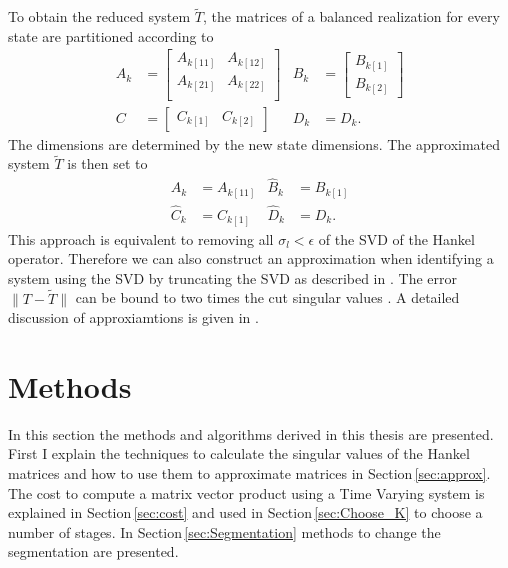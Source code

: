 \documentclass[numbers=noenddot,doctype=mastersthesis,BCOR=15mm,biblatex]{ldvbook}%
\begin{document}
To obtain the reduced system $\tilde{T}$, the matrices of a balanced realization for every state are partitioned according to
\begin{subequations}\label{eq:segmented_system}
\begin{align}
	A_k &=\begin{bmatrix}
	A_{k[11]} & A_{k[12]} \\
	A_{k[21]} & A_{k[22]} \\
	\end{bmatrix}
	&
	B_k &= \begin{bmatrix}
	B_{k[1]} \\ B_{k[2]}
	\end{bmatrix} 
	\\
	C &= \begin{bmatrix}
	C_{k[1]} & C_{k[2]}
	\end{bmatrix}& 
	D_k&=D_k.
\end{align}
\end{subequations}
The dimensions are determined by the new state dimensions.
The approximated system $\tilde{T}$ is then set to
\begin{subequations}
\begin{align}\label{eq:reduced_system}
	\hat{A}_k &= A_{k[11]}  & \hat{B}_k &= B_{k[1]}\\
	\hat{C}_k &=C_{k[1]}      & \hat{D}_k &= D_k.
\end{align}
\end{subequations}
This approach is equivalent to removing all $\sigma_l<\epsilon$ of the SVD of the Hankel operator.
Therefore we can also construct an approximation when identifying a system using the SVD by truncating the SVD as described in \cite{shokoohi_identification_1987}.
The error $\|T-\tilde{T}\|$ can be bound to two times the cut singular values \cite{lall_error-bounds_2003}.
A detailed discussion of approxiamtions is given in
\cite{antoulas_approximation_2005}.

\chapter{Methods}\label{chap:methods}
In this section the methods and algorithms derived in this thesis are presented.
First I explain the techniques to calculate the singular values of the Hankel matrices and how to use them to approximate matrices in Section\,\ref{sec:approx}.
The cost to compute a matrix vector product using a Time Varying system is explained in Section\,\ref{sec:cost} and used in Section\,\ref{sec:Choose_K} to choose a number of stages. 
In Section\,\ref{sec:Segmentation} methods to change the segmentation are presented.
\end{document}
